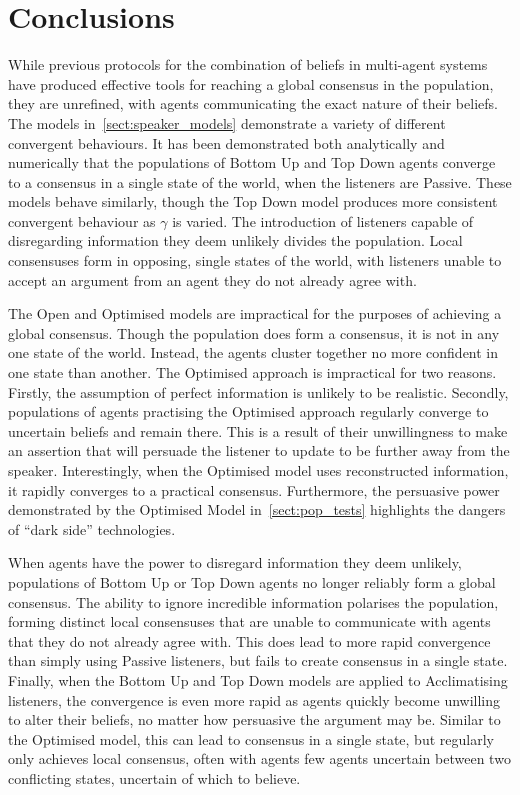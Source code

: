 \chapter{Conclusions}

While previous protocols for the combination of beliefs in multi-agent systems have produced effective tools for reaching a global consensus in the population, they are unrefined, with agents communicating the exact nature of their beliefs. The models in~\cref{sect:speaker_models} demonstrate a variety of different convergent behaviours. It has been demonstrated both analytically and numerically that the populations of Bottom Up and Top Down agents converge to a consensus in a single state of the world, when the listeners are Passive. These models behave similarly, though the Top Down model produces more consistent convergent behaviour as $\gamma$ is varied. The introduction of listeners capable of disregarding information they deem unlikely divides the population. Local consensuses form in opposing, single states of the world, with listeners unable to accept an argument from an agent they do not already agree with. 

The Open and Optimised models are impractical for the purposes of achieving a global consensus. Though the population does form a consensus, it is not in any one state of the world. Instead, the agents cluster together no more confident in one state than another. The Optimised approach is impractical for two reasons. Firstly, the assumption of perfect information is unlikely to be realistic. Secondly, populations of agents practising the Optimised approach regularly converge to uncertain beliefs and remain there. This is a result of their unwillingness to make an assertion that will persuade the listener to update to be further away from the speaker. Interestingly, when the Optimised model uses reconstructed information, it rapidly converges to a practical consensus. Furthermore, the persuasive power demonstrated by the Optimised Model in~\cref{sect:pop_tests} highlights the dangers of ``dark side'' technologies. 

When agents have the power to disregard information they deem unlikely, populations of Bottom Up or Top Down agents no longer reliably form a global consensus. The ability to ignore incredible information polarises the population, forming distinct local consensuses that are unable to communicate with agents that they do not already agree with. This does lead to more rapid convergence than simply using Passive listeners, but fails to create consensus in a single state. Finally, when the Bottom Up and Top Down models are applied to Acclimatising listeners, the convergence is even more rapid as agents quickly become unwilling to alter their beliefs, no matter how persuasive the argument may be. Similar to the Optimised model, this can lead to consensus in a single state, but regularly only achieves local consensus, often with agents few agents uncertain between two conflicting states, uncertain of which to believe. 

